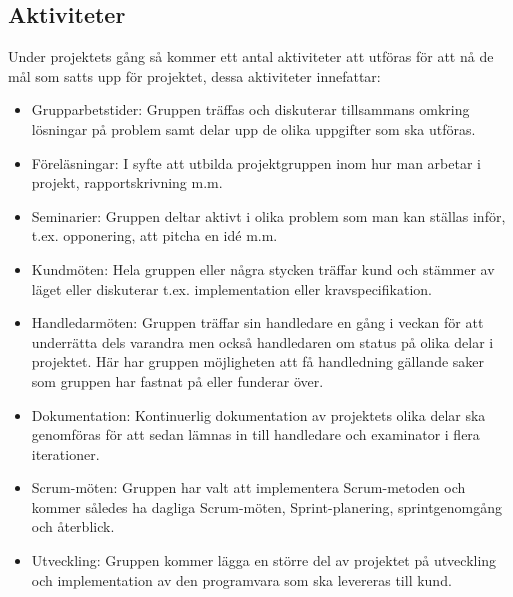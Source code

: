 \documentclass[a4paper,10pt, twoside]{article}
\begin{document}
\subsection{Aktiviteter}
Under projektets gång så kommer ett antal aktiviteter att utföras för att nå de mål som satts upp för projektet, dessa aktiviteter innefattar:
\begin{itemize}
\item Grupparbetstider: Gruppen träffas och diskuterar tillsammans omkring lösningar på problem samt delar upp de olika uppgifter som ska utföras.
\item Föreläsningar: I syfte att utbilda projektgruppen inom hur man arbetar i projekt, rapportskrivning m.m.
\item Seminarier: Gruppen deltar aktivt i olika problem som man kan ställas inför, t.ex. opponering, att pitcha en idé m.m.
\item Kundmöten: Hela gruppen eller några stycken träffar kund och stämmer av läget eller diskuterar t.ex. implementation eller kravspecifikation.
\item Handledarmöten: Gruppen träffar sin handledare en gång i veckan för att underrätta dels varandra men också handledaren om status på olika delar i projektet. Här har gruppen möjligheten att få handledning gällande saker som gruppen har fastnat på eller funderar över.
\item Dokumentation: Kontinuerlig dokumentation av projektets olika delar ska genomföras för att sedan lämnas in till handledare och examinator i flera iterationer.
\item Scrum-möten: Gruppen har valt att implementera Scrum-metoden och kommer således ha dagliga Scrum-möten, Sprint-planering, sprintgenomgång och återblick.
\item Utveckling: Gruppen kommer lägga en större del av projektet på utveckling och implementation av den programvara som ska levereras till kund.
\end{itemize}
\end{document}
